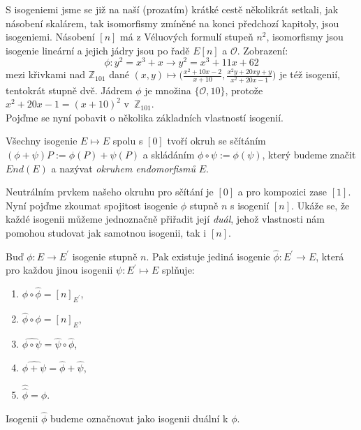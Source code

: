 \documentclass [12pt]{report}
\begin{document}
S isogeniemi jsme se již na naší (prozatím) krátké cestě několikrát setkali, jak násobení skalárem, tak isomorfismy zmíněné na konci předchozí kapitoly, jsou isogeniemi. Násobení $[n]$ má z Véluových formulí stupeň $n^2$, isomorfismy jsou isogenie lineární a jejich jádry jsou po řadě $E[n]$ a $\mathcal{O}$. Zobrazení:
\begin{equation*}
\phi : y^2 = x^3+x \longrightarrow y^2 =  x^3 + 11x + 62
\end{equation*}
mezi křivkami nad $\mathbb{Z}_{101}$ dané $(x,y) \mapsto \Big(\frac{x^2 + 10x - 2}{x+10},\frac{x^2 y + 20xy + y}{x^2 + 20x - 1}\Big)$ je též isogenií, tentokrát stupně dvě. Jádrem $\phi$ je množina $\lbrace \mathcal{O},10 \rbrace$, protože $x^2 + 20x - 1 = (x+10)^2$ v~$\mathbb{Z}_{101}$.\\

Pojďme se nyní pobavit o několika základních vlastností isogenií.

\begin{veta}
Všechny isogenie $E \mapsto E$ spolu s $[0]$ tvoří okruh se sčítáním $(\phi + \psi)P := \phi (P) + \psi (P)$ a skládáním $\phi \circ \psi  := \phi(\psi)$, který budeme značit $End(E)$ a nazývat \textit{okruhem endomorfismů } $E$. 
\end{veta}
Neutrálním prvkem našeho okruhu pro sčítání je $[0]$ a pro kompozici zase $[1]$. Nyní pojďme zkoumat spojitost isogenie $\phi $ stupně $n$ s isogenií $[n]$. Ukáže se, že každé isogenii můžeme jednoznačně přiřadit její \textit{duál}, jehož vlastnosti nám pomohou studovat jak samotnou isogenii, tak i $[n]$.

\begin{veta}\label{dual}
Buď $\phi: E \longrightarrow E^\prime$ isogenie stupně $n$. Pak existuje jediná isogenie $\hat{\phi}: E^\prime \longrightarrow E$, která pro každou jinou isogenii $\psi: E^\prime \mapsto E$ splňuje:
\begin{enumerate}
\item $\phi \circ \hat{\phi} = [n]_{E^\prime}$,
\item $\hat{\phi} \circ \phi = [n]_E$,
\item $\widehat{\phi \circ \psi} = \hat{\psi} \circ \hat{\phi}$,
\item $\widehat{\phi + \psi} = \hat{\phi} + \hat{\psi}$,
\item $\hat{\hat{\phi} } = \phi $.
\end{enumerate} 
Isogenii $\hat{\phi}$ budeme označnovat jako isogenii duální k $\phi$.
\end{veta}
\end{document}
